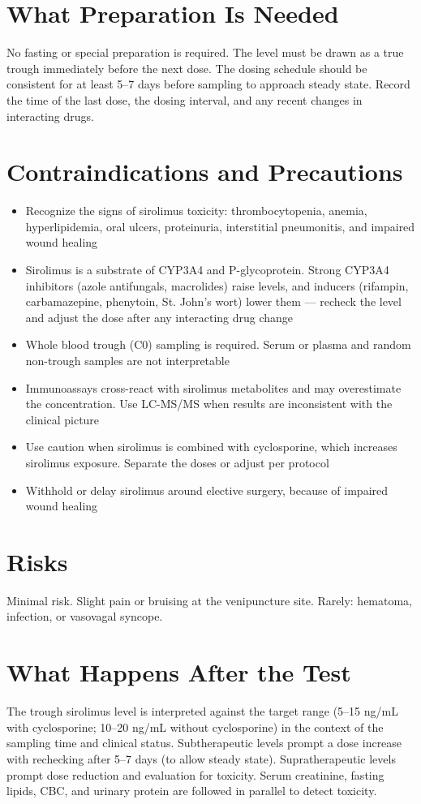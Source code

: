 \section*{What Preparation Is Needed}
No fasting or special preparation is required. The level must be drawn as a true trough immediately before the next dose. The dosing schedule should be consistent for at least 5--7 days before sampling to approach steady state. Record the time of the last dose, the dosing interval, and any recent changes in interacting drugs.
\section*{Contraindications and Precautions}
\begin{itemize}
  \item Recognize the signs of sirolimus toxicity: thrombocytopenia, anemia, hyperlipidemia, oral ulcers, proteinuria, interstitial pneumonitis, and impaired wound healing
  \item Sirolimus is a substrate of CYP3A4 and P-glycoprotein. Strong CYP3A4 inhibitors (azole antifungals, macrolides) raise levels, and inducers (rifampin, carbamazepine, phenytoin, St. John's wort) lower them --- recheck the level and adjust the dose after any interacting drug change
  \item Whole blood trough (C0) sampling is required. Serum or plasma and random non-trough samples are not interpretable
  \item Immunoassays cross-react with sirolimus metabolites and may overestimate the concentration. Use LC-MS/MS when results are inconsistent with the clinical picture
  \item Use caution when sirolimus is combined with cyclosporine, which increases sirolimus exposure. Separate the doses or adjust per protocol
  \item Withhold or delay sirolimus around elective surgery, because of impaired wound healing
\end{itemize}
\section*{Risks}
Minimal risk. Slight pain or bruising at the venipuncture site. Rarely: hematoma, infection, or vasovagal syncope.
\section*{What Happens After the Test}
The trough sirolimus level is interpreted against the target range (5--15 ng/mL with cyclosporine; 10--20 ng/mL without cyclosporine) in the context of the sampling time and clinical status. Subtherapeutic levels prompt a dose increase with rechecking after 5--7 days (to allow steady state). Supratherapeutic levels prompt dose reduction and evaluation for toxicity. Serum creatinine, fasting lipids, CBC, and urinary protein are followed in parallel to detect toxicity.
